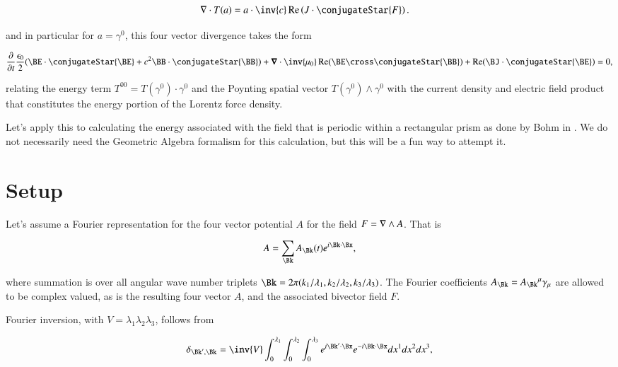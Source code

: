 \begin{align}\label{eqn:fourierMaxVac:3}
\grad \cdot T(a) &= a \cdot \inv{ c } \Real \left( J \cdot \conjugateStar{F} \right).
\end{align}

and in particular for $a = \gamma^0$, this four vector divergence takes the form

\begin{align}\label{eqn:fourierMaxVac:4}
\PD{t}{}\frac{\epsilon_0}{2}(\BE \cdot \conjugateStar{\BE} + c^2 \BB \cdot \conjugateStar{\BB})
+ \spacegrad \cdot \inv{\mu_0} \Real (\BE \cross \conjugateStar{\BB} )
+ \Real( \BJ \cdot \conjugateStar{\BE} ) 
= 0,
\end{align}

relating the energy term $T^{00} = T(\gamma^0) \cdot \gamma^0$ and the Poynting spatial vector $T(\gamma^0) \wedge \gamma^0$ with the current density and electric field product that constitutes the energy portion of the Lorentz force density.

Let's apply this to calculating the energy associated with the field that is periodic within a rectangular prism as done by Bohm in \cite{bohm1989qt}.  We do not necessarily need the Geometric Algebra formalism for this calculation, but this will be a fun way to attempt it.

\section{Setup}

Let's assume a Fourier representation for the four vector potential $A$ for the field $F = \nabla \wedge A$.  That is

\begin{align}
\label{eqn:fourierMaxVac:5}
A = \sum_{\Bk} A_\Bk(t) e^{i \Bk \cdot \Bx},
\end{align}

where summation is over all angular wave number triplets $\Bk = 2 \pi (k_1/\lambda_1, k_2/\lambda_2, k_3/\lambda_3)$.  The Fourier coefficients $A_\Bk = {A_\Bk}^\mu \gamma_\mu$ are allowed to be complex valued, as is the resulting four vector $A$, and the associated bivector field $F$.

Fourier inversion, with $V = \lambda_1 \lambda_2 \lambda_3$, follows from

\begin{align}\label{eqn:fourierMaxVac:6}
\delta_{\Bk', \Bk} =
\inv{ V }
\int_0^{\lambda_1}
\int_0^{\lambda_2}
\int_0^{\lambda_3} 
e^{ i \Bk' \cdot \Bx} 
e^{-i \Bk \cdot \Bx} dx^1 dx^2 dx^3,
\end{align}

